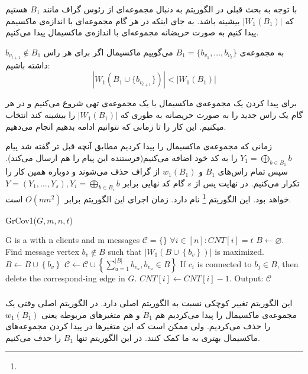  با توجه به بحث قبلی در الگوریتم
\GRCOVone
به دنبال مجموعه‌ای از رئوس گراف مانند
$B_1$
هستیم که 
$|W_1(B_1)|$
بیشینه باشد. به جای اینکه در هر گام مجموعه‌ای با اندازه‌ی ماکسیمم پیدا کنیم به صورت حریضانه مجموعه‌ای با اندازه‌ی ماکسیمال پیدا می‌کنیم.

به مجموعه‌ی 
$B_1 = \{b_{v_1}, \ldots, b_{v_t}\}$
می‌گوییم ماکسیمال اگر برای هر راس
$b_{v_{t  +1}} \notin B_1$
داشته باشیم:
\begin{equation}
	\tag{شرط ماکسیمال بودن}
	|W_1(B_1 \cup \{b_{v_{t + 1}} \})| < |W_1(B_1)|
\end{equation}

برای پیدا کردن یک مجموعه‌ی ماکسیمال با یک مجموعه‌ی تهی شروع می‌کنیم و در هر گام یک راس جدید را به صورت حریصانه به طوری که 
$|W_1(B_1)|$
را بیشینه کند انتخاب میکنیم. این کار را تا زمانی که نتوانیم ادامه بدهیم انجام می‌دهیم.

زمانی که مجموعه‌ی ماکسیمال را پیدا کردیم مطابق آنچه قبل تر گفته شد پیام
 $Y_1 = \bigoplus\limits_{b \in B_1} b$
 را به کد خود اضافه می‌کنیم(فرستنده این پیام را هم ارسال می‌کند). سپس تمام راس‌های
 $B_1$
 و
 $w_1(B_1)$
 از گراف حذف می‌شوند و دوباره همین کار را تکرار می‌کنیم. در نهایت پس از 
 $s$
 گام کد نهایی برابر
 $Y = (Y_1, \ldots, Y_s), Y_i =  \bigoplus\limits_{b \in B_i} b$
 خواهد بود. این الگوریتم
 \GRCOVone\footnote{}
 	نام دارد. زمان اجرای این الگوریتم برابر
 	$O(mn^2)$
 	است.
 	\begin{algorithm}[H]
 		\caption{GrCov1($G,m,n,t$) \cite{pliable2015paper}}
 		\label{algorithm:grcov1}
 		\begin{algorithmic}[1]
 			\State G is a \picodt with n clients and m messages
 			\State $\mathcal{C} = \{\}$
 			\State $\forall i \in [n]: CNT[i] = t$ 
		 			\State $B \leftarrow \varnothing$.
				 			\State Find message vertex $b_v \notin B$ such that $\left|W_1\left(B \cup\left\{b_v\right\}\right)\right|$ is maximized.
				 			\State $B \leftarrow B \cup\left\{b_v\right\}$
		 			\EndWhile
		 			\State $\mathcal{C} \leftarrow \mathcal{C} \cup\left\{\sum_{u=1}^{|B|} b_{v_u}, b_{v_u} \in B\right\}$
		 			\State If $c_i$ is connected to $b_j \in B$, then delete the correspond-ing edge in $G$.
		 			\State $CNT[i] \leftarrow CNT[i]-1$.
		 			\EndFor
 			\EndWhile
 			\State Output: $\mathcal{C}$
 		\end{algorithmic}
 	\end{algorithm}
 \subsubsection{
 }
 این الگوریتم تغییر کوچکی نسبت به الگوریتم اصلی دارد. در الگوریتم اصلی وقتی یک مجموعه‌ی ماکسیمال را پیدا می‌کردیم هم
 $B_1$
 و هم متغیرهای مربوطه یعنی
 $w_1(B_1)$
 را حذف می‌کردیم. ولی ممکن است که این متغیرها در پیدا کردن مجموعه‌های ماکسیمال بهتری به ما کمک کنند. در این الگوریتم تنها
 $B_1$
 را حذف می‌کنیم.
 
